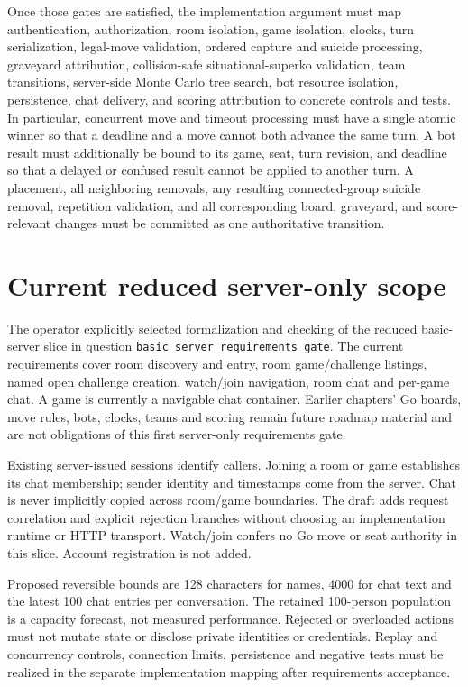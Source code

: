 \documentclass[11pt,oneside]{book}
\begin{document}
Once those gates are satisfied, the implementation argument must map authentication, authorization, room isolation, game isolation, clocks, turn serialization, legal-move validation, ordered capture and suicide processing, graveyard attribution, collision-safe situational-superko validation, team transitions, server-side Monte Carlo tree search, bot resource isolation, persistence, chat delivery, and scoring attribution to concrete controls and tests. In particular, concurrent move and timeout processing must have a single atomic winner so that a deadline and a move cannot both advance the same turn. A bot result must additionally be bound to its game, seat, turn revision, and deadline so that a delayed or confused result cannot be applied to another turn. A placement, all neighboring removals, any resulting connected-group suicide removal, repetition validation, and all corresponding board, graveyard, and score-relevant changes must be committed as one authoritative transition.


\chapter{Current reduced server-only scope}
The operator explicitly selected formalization and checking of the reduced
basic-server slice in question \texttt{basic\_server\_requirements\_gate}.
The current requirements cover room discovery and entry, room game/challenge
listings, named open challenge creation, watch/join navigation, room chat and
per-game chat. A game is currently a navigable chat container. Earlier chapters'
Go boards, move rules, bots, clocks, teams and scoring remain future roadmap
material and are not obligations of this first server-only requirements gate.

Existing server-issued sessions identify callers. Joining a room or game
establishes its chat membership; sender identity and timestamps come from the
server. Chat is never implicitly copied across room/game boundaries. The draft
adds request correlation and explicit rejection branches without choosing an
implementation runtime or HTTP transport. Watch/join confers no Go move or seat
authority in this slice. Account registration is not added.

Proposed reversible bounds are 128 characters for names, 4000 for chat text and
the latest 100 chat entries per conversation. The retained 100-person population
is a capacity forecast, not measured performance. Rejected or overloaded actions
must not mutate state or disclose private identities or credentials. Replay and
concurrency controls, connection limits, persistence and negative tests must be
realized in the separate implementation mapping after requirements acceptance.
\end{document}
